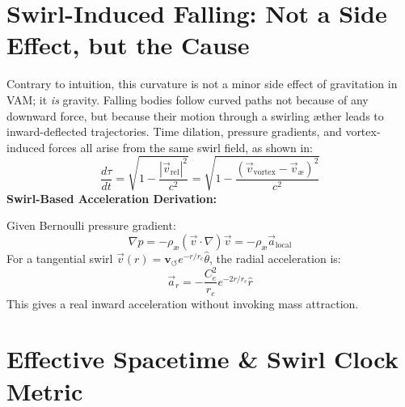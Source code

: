 \documentclass[11pt]{article}
\begin{document}
    \section*{Swirl-Induced Falling: Not a Side Effect, but the Cause}

    Contrary to intuition, this curvature is not a minor side effect of gravitation in VAM; it \textit{is} gravity. Falling bodies follow curved paths not because of any downward force, but because their motion through a swirling \ae ther leads to inward-deflected trajectories. Time dilation, pressure gradients, and vortex-induced forces all arise from the same swirl field, as shown in:
    \begin{equation}
        \frac{d\tau}{dt} = \sqrt{1 - \frac{|\vec{v}_\text{rel}|^2}{c^2}} = \sqrt{1 - \frac{(\vec{v}_\text{vortex} - \vec{v}_\text{\ae})^2}{c^2}}
    \end{equation}
    \textbf{Swirl-Based Acceleration Derivation:}

    Given Bernoulli pressure gradient:
    \begin{equation}
        \nabla p = - \rho_\text{\ae} (\vec{v} \cdot \nabla) \vec{v} = - \rho_\text{\ae} \vec{a}_\text{local}
    \end{equation}
    For a tangential swirl $\vec{v}(r) = \mathbf{v}_{\scriptscriptstyle\boldsymbol{\circlearrowleft}} e^{-r/r_c} \hat{\theta}$, the radial acceleration is:
    \begin{equation}
        \vec{a}_r = -\frac{C_e^2}{r_c} e^{-2r/r_c} \hat{r}
    \end{equation}
    This gives a real inward acceleration without invoking mass attraction.

    \begin{center}
    \end{center}

    \section*{Effective Spacetime \& Swirl Clock Metric}
\end{document}
